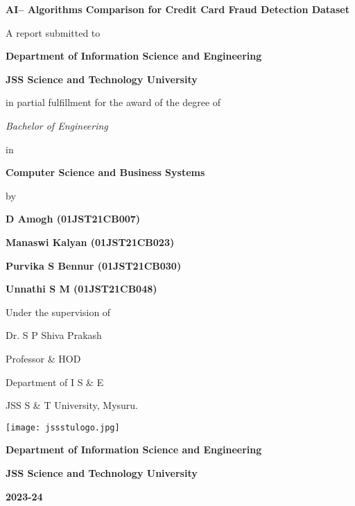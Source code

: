 \documentclass[12pt,a4paper]{report}
\begin{document}
\begin{titlepage}
    \centering
    
    {\Huge \bfseries{AI– Algorithms Comparison for Credit Card Fraud Detection Dataset }\par}
    \vspace{0.5cm}
    {\large A report submitted to \par{\textbf{Department of Information Science and Engineering} \par \textbf{JSS Science and Technology University} }\par in partial fulfillment  for the award of the degree of\par}
    {\large\itshape  Bachelor of Engineering\par in\par}
    \vspace{0.5cm}
    {\Large\bfseries \textbf{Computer Science and Business Systems}\par}  %
    \vspace{0.5cm}
    {\large by\par}
    \vspace{1cm}
    {\Large\bfseries D Amogh (01JST21CB007)\par}
    \vspace{0.2cm}
    {\Large\bfseries Manaswi Kalyan (01JST21CB023)\par}
    \vspace{0.2cm}
     {\Large\bfseries Purvika S Bennur (01JST21CB030)\par}
    \vspace{0.2cm}
     {\Large\bfseries Unnathi S M (01JST21CB048)\par}
    \vspace{1cm}
  { \large Under the supervision of  \par \par Dr. S P Shiva Prakash \par Professor \& HOD \par Department of I S \& E \par JSS S \& T University, Mysuru. }
    \vspace{1cm}
        
    \texttt{[image: jssstulogo.jpg]}\\

    \vspace{0.4cm}
    {\Large\bfseries Department of Information Science and Engineering\par}
    {\Large\bfseries JSS Science and Technology University\par}
   
    {\Large\bfseries 2023-24\par}
\end{titlepage}
\end{document}
